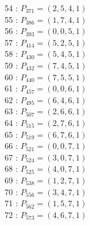 \documentclass{article}
\begin{document}
{\begin{multicols}{3}
54 : $P_{371}=( 2, 5, 4, 1 )$\\
55 : $P_{386}=( 1, 7, 4, 1 )$\\
56 : $P_{393}=( 0, 0, 5, 1 )$\\
57 : $P_{414}=( 5, 2, 5, 1 )$\\
58 : $P_{430}=( 5, 4, 5, 1 )$\\
59 : $P_{432}=( 7, 4, 5, 1 )$\\
60 : $P_{440}=( 7, 5, 5, 1 )$\\
61 : $P_{457}=( 0, 0, 6, 1 )$\\
62 : $P_{495}=( 6, 4, 6, 1 )$\\
63 : $P_{507}=( 2, 6, 6, 1 )$\\
64 : $P_{515}=( 2, 7, 6, 1 )$\\
65 : $P_{519}=( 6, 7, 6, 1 )$\\
66 : $P_{521}=( 0, 0, 7, 1 )$\\
67 : $P_{524}=( 3, 0, 7, 1 )$\\
68 : $P_{525}=( 4, 0, 7, 1 )$\\
69 : $P_{538}=( 1, 2, 7, 1 )$\\
70 : $P_{556}=( 3, 4, 7, 1 )$\\
71 : $P_{562}=( 1, 5, 7, 1 )$\\
72 : $P_{573}=( 4, 6, 7, 1 )$\\
\end{multicols}


%


%


}%
\end{document}

